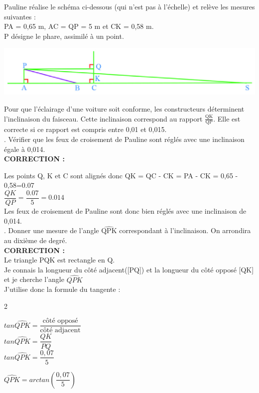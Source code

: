 \documentclass[a4paper,11pt]{article}
\newcounter{enumtabi}
\newcommand{\q}{\stepcounter{enumtabi} \theenumtabi.  }
\newcommand{\initq}{\setcounter{enumtabi}{0}}
\newcommand{\bmul}[1]{\begin{multicols}{#1}}
\newcommand{\emul}{\end{multicols}}
\begin{document}
Pauline réalise le schéma ci-dessous (qui n'est pas à l'échelle) et relève les mesures suivantes : \\
PA = 0,65 m, AC = QP = 5 m et CK = 0,58 m.\\
P désigne le phare, assimilé à un point.

\begin{center}
\includegraphics[scale=0.85]{trigo7.eps} 
\end{center}

Pour que l'éclairage d'une voiture soit conforme, les constructeurs déterminent l'inclinaison du faisceau. Cette inclinaison correspond au rapport $\frac{\mathrm{QK}}{\mathrm{QP}}$. Elle est correcte si ce rapport est compris entre 0,01 et 0,015.\\

\initq \q Vérifier que les feux de croisement de Pauline sont réglés avec une inclinaison égale à 0,014.\\


\color{red}
\textbf{CORRECTION :}

Les points Q, K et C sont alignés donc QK = QC - CK = PA - CK = 0,65 - 0,58=0.07\\

$\dfrac{QK}{QP}=\dfrac{0.07}{5}=0.014$\\


Les feux de croisement de Pauline sont donc bien réglés avec une inclinaison de 0,014.\\

\color{black}
\q Donner une mesure de l'angle $\widehat{\mathrm{QPK}}$ correspondant à l'inclinaison. On arrondira au dixième de degré.\\



\color{red}
\textbf{CORRECTION :}\\
Le triangle PQK est rectangle en Q. \\
Je connais la longueur du côté adjacent([PQ]) et la longueur du côté opposé [QK] et je cherche l'angle $\widehat{QPK}$\\

J'utilise donc la formule du tangente :

\bmul{2}

$tan \widehat{QPK} = \dfrac{\textrm{côté opposé}}{\textrm{côté adjacent}} $\\

$tan \widehat{QPK} = \dfrac{QK}{PQ}$\\

$tan \widehat{QPK} = \dfrac{0,07}{5}$\\

\columnbreak

 $ \widehat{QPK} = arctan(\dfrac{0,07}{5})$\\


\emul




\color{black}
\end{document}
